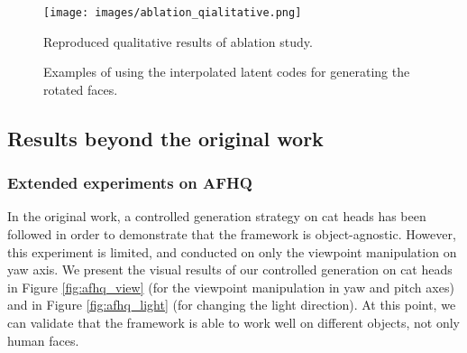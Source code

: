 \begin{figure}[t!]%
    \centering
    {\texttt{[image: images/ablation\_qialitative.png]} }%
    \caption{Reproduced qualitative results of ablation study.}%
    \label{fig:ablation_qual}%
\end{figure}

\begin{figure}[t!]%
    \centering
    \caption{Examples of using the interpolated latent codes for generating the rotated faces.}%
    \label{fig:interpolation}%
\end{figure}

\subsection{Results beyond the original work}

\subsubsection{Extended experiments on AFHQ}

In the original work, a controlled generation strategy on cat heads has been followed in order to demonstrate that the framework is object-agnostic. However, this experiment is limited, and conducted on only the viewpoint manipulation on yaw axis. We present the visual results of our controlled generation on cat heads in Figure \ref{fig:afhq_view} (for the viewpoint manipulation in yaw and pitch axes) and in Figure \ref{fig:afhq_light} (for changing the light direction). At this point, we can validate that the framework is able to work well on different objects, not only human faces.



